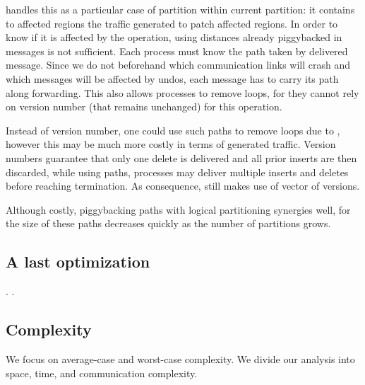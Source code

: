 \noindent \NAME handles this as a particular case of partition within
current partition: it contains to affected regions the traffic
generated to patch affected regions. In order to know if it is
affected by the  operation, using distances already
piggybacked in messages is not sufficient.  Each process must know the
path taken by delivered message. Since we do not beforehand which
communication links will crash and which messages will be affected by
undos, each message has to carry its path along forwarding. This also
allows processes to remove loops, for they cannot rely on version
number (that remains unchanged) for this operation.

\noindent Instead of version number, one could use such paths to remove loops
due to , however this may be much more costly in
terms of generated traffic. Version numbers guarantee that only one
delete is delivered and all prior inserts are then discarded, while
using paths, processes may deliver multiple inserts and deletes before
reaching termination.  As
consequence, \NAME still makes use of vector of versions.

\noindent Although costly, piggybacking paths with logical partitioning synergies
well, for the size of these paths decreases quickly as the number of
partitions grows.

\subsection{A last optimization}
 . .

\subsection{Complexity}
\label{subsec:complexity}


We focus on average-case and worst-case complexity. We divide our
analysis into space, time, and communication complexity.

